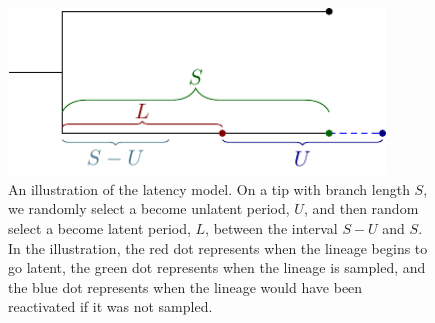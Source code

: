 \documentclass[12pt]{article}
\begin{document}
\begin{figure}[ht]
	\centering{}
	\includegraphics[width=10cm]{figures/latency-model}
	\caption[Latency Model]{An illustration of the latency model. On a tip with branch length $S$, we randomly select a become unlatent period, $U$, and then random select a become latent period, $L$, between the interval $S-U$ and $S$. In the illustration, the red dot represents when the lineage begins to go latent, the green dot represents when the lineage is sampled, and the blue dot represents when the lineage would have been reactivated if it was not sampled. }
	\label{fig:latencymodel}
\end{figure}
\end{document}
